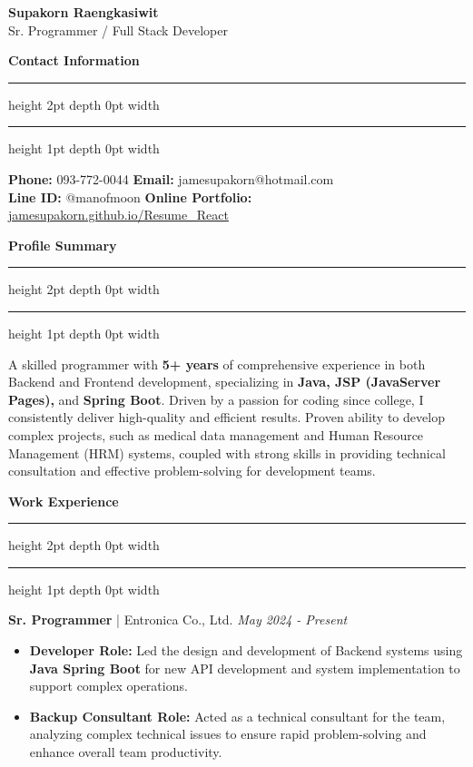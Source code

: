 \documentclass[11pt, a4paper]{article}
\newcommand{\sectiontitle}[1]{
    \vspace{1em}
    {\Large\bfseries\sffamily\color{primaryblue} #1} 
    \vspace{0.3em}
    \hrule height 2pt depth 0pt width \textwidth \color{linecolor}
    \hrule height 1pt depth 0pt width \textwidth
    \vspace{0.7em}
}
\newcommand{\jobentry}[3]{
    \vspace{0.7em} %
    \textbf{\color{black}#1} | #2 \hfill \emph{#3}
}
\begin{document}
\thispagestyle{empty} %

\begin{center}
    {\Huge\bfseries\sffamily Supakorn Raengkasiwit} \\
    \vspace{0.2em}
    {\Large\sffamily Sr. Programmer / Full Stack Developer}
\end{center}

\vspace{1em}

\sectiontitle{Contact Information}

\begin{flushleft}
    \color{black}
    	\textbf{Phone:} 093-772-0044 \hfill \textbf{Email:} jamesupakorn@hotmail.com \\
    \vspace{0.1em} %
    	\textbf{Line ID:} @manofmoon \hfill \textbf{Online Portfolio:} \href{https://jamesupakorn.github.io/Resume_React}{jamesupakorn.github.io/Resume\_React} \\
\end{flushleft}


\sectiontitle{Profile Summary}

\color{black}
A skilled programmer with \textbf{5+ years} of comprehensive experience in both Backend and Frontend development, specializing in \textbf{Java, JSP (JavaServer Pages),} and \textbf{Spring Boot}. Driven by a passion for coding since college, I consistently deliver high-quality and efficient results. Proven ability to develop complex projects, such as medical data management and Human Resource Management (HRM) systems, coupled with strong skills in providing technical consultation and effective problem-solving for development teams.

\sectiontitle{Work Experience}
\color{black}

\jobentry{Sr. Programmer}{Entronica Co., Ltd.}{May 2024 - Present}
\begin{itemize}
    \item \textbf{Developer Role:} Led the design and development of Backend systems using \textbf{Java Spring Boot} for new API development and system implementation to support complex operations.
    \item \textbf{Backup Consultant Role:} Acted as a technical consultant for the team, analyzing complex technical issues to ensure rapid problem-solving and enhance overall team productivity.
\end{itemize}
\vspace{0.5em} 
\end{document}
